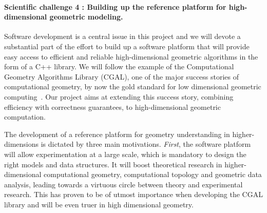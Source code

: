 \paragraph{Scientific challenge 4 : Building up the reference platform for high-dimensional geometric modeling.}





Software development is a central issue in this project and we will devote a substantial part of the effort to build up a software platform that will provide easy access to efficient and reliable high-dimensional geometric algorithms in the form of a C++ library. We will follow the example of the Computational Geometry Algorithms Library (CGAL), one of the major success stories of computational geometry, by now the gold standard for low dimensional geometric computing~\cite{cgal}. 
 Our project aims at extending this success story, combining efficiency with correctness guarantees, to high-dimensional geometric computation.

 The development of a reference platform for geometry understanding in higher-dimensions is dictated by three main motivations.  {\em First}, the software platform will allow experimentation at a large scale, which is mandatory to design the right models and data structures. It will boost theoretical research in higher-dimensional computational geometry, computational topology and geometric data analysis, leading towards a virtuous circle between theory and experimental research. This has proven to be of utmost importance when developing the CGAL library and will be even truer in high dimensional geometry.

